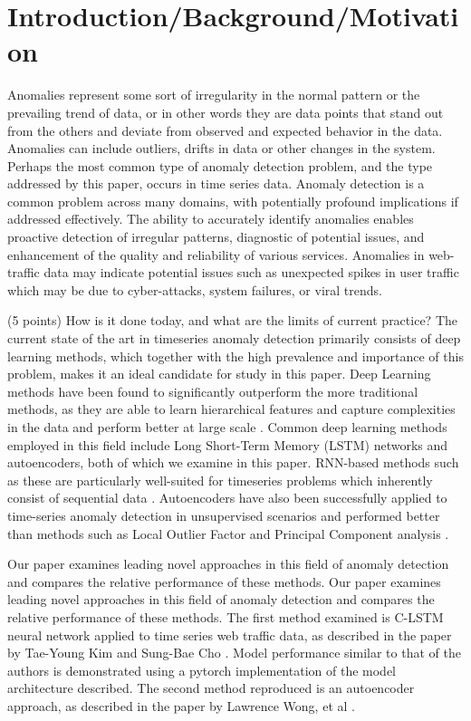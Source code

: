 \documentclass[10pt,twocolumn,letterpaper]{article}
\begin{document}
\section{Introduction/Background/Motivation}

Anomalies represent some sort of irregularity in the normal pattern or the prevailing trend of data, or in other words they are data points that stand out from the others 
and deviate from observed and expected behavior in the data. Anomalies can include outliers, drifts in data or other changes in the system. Perhaps the most common type of 
anomaly detection problem, and the type addressed by this paper, occurs in time series data. Anomaly detection is a common problem across many domains, with potentially profound 
implications if addressed effectively. The ability to accurately identify anomalies enables proactive detection of irregular patterns, diagnostic of potential issues, and enhancement 
of the quality and reliability of various services. Anomalies in web-traffic data may indicate potential issues such as unexpected spikes in user traffic which may be due to 
cyber-attacks, system failures, or viral trends. 

(5 points) How is it done today, and what are the limits of current practice?
The current state of the art in timeseries anomaly detection primarily consists of deep learning methods, which together with the high prevalence and importance of this problem, makes it an 
ideal candidate for study in this paper. Deep Learning methods have been found to significantly outperform the more traditional methods, as they are able to learn hierarchical features and capture 
complexities in the data and perform better at large scale \cite{chalapathy2019deep}. Common deep learning methods employed in this field include Long Short-Term Memory (LSTM) networks and autoencoders, both of which we 
examine in this paper. RNN-based methods such as these are particularly well-suited for timeseries problems which inherently consist of sequential data \cite{chalapathy2019deep}. Autoencoders have also been successfully 
applied to time-series anomaly detection in unsupervised scenarios and performed better than methods such as Local Outlier Factor and Principal Component analysis \cite{hagemann2020reconstruction}.

Our paper examines leading novel approaches in this field of anomaly detection and compares the relative performance of these methods. Our paper examines leading novel approaches in this field of anomaly detection and compares 
the relative performance of these methods. The first method examined is C-LSTM neural network applied to time series web traffic data, as described in the paper by Tae-Young Kim and Sung-Bae Cho \cite{kim2018web}. 
Model performance similar to that of the authors is demonstrated using a pytorch implementation of the model architecture described. The second method reproduced is an autoencoder approach, as
described in the paper by Lawrence Wong, et al \cite{wong2022aer}.
\end{document}
